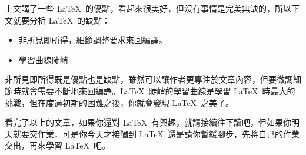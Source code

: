 上文講了一些 \LaTeX\ 的優點，看起來很美好，但沒有事情是完美無缺的，所以下文就要分析 \LaTeX\ 的缺點：

\begin{itemize}
\item 非所見即所得，細節調整要求來回編譯。
\item 學習曲線陡峭
\end{itemize}

非所見即所得既是優點也是缺點，雖然可以讓作者更專注於文章內容，但要微調細節時就會需要不斷地來回編譯。\LaTeX\ 陡峭的學習曲線是學習 \LaTeX\ 時最大的挑戰，但在度過初期的困難之後，你就會發現 \LaTeX\ 之美了。

看完了以上的文章，如果你還對 \LaTeX\ 有興趣，就請接續往下讀吧，但如果你明天就要交作業，可是你今天才接觸到 \LaTeX\ 還是請你暫緩腳步，先將自己的作業交出，再來學習 \LaTeX\ 吧。
